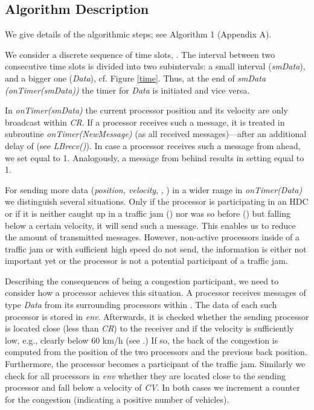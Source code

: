 \documentclass{acmrip}
\begin{document}
\subsection{Algorithm Description}
We give details of the algorithmic steps; see Algorithm 1 (Appendix
A).

We consider a discrete sequence of time slots, . The interval between two consecutive time slots is divided
into two subintervals: a small interval ({\em {smData}}), and a bigger
one ({\em Data}), cf. Figure \ref{time}. Thus, at the end of {\em
smData (onTimer(smData))} the timer for {\em Data} is initiated and
vice versa.


In {\em onTimer(smData)} the current processor position and its
velocity are only broadcast within {\em CR}. If a processor receives such a
message, it is treated in subroutine {\em onTimer(NewMessage)} (as
all received
messages)---after an additional delay of  (see {\em LBrecv()}). In case a processor receives such a message from ahead, we set
 equal to 1. Analogously, a message from behind results in
setting  equal to 1.

For sending more data ({\em position, velocity}, , ) in a
wider range in {\em onTimer(Data)} we distinguish several
situations. Only if the processor is participating in an HDC or if it
is neither caught up in a traffic jam () nor was so before
() but falling below a certain velocity, it will send such
a message. This enables us to reduce the amount of transmitted
messages. However, non-active processors inside of a traffic jam or
with sufficient high speed do not send, the information is either
not important yet or the processor is not a potential participant of
a traffic jam.

Describing the consequences of being a congestion participant, we
need to consider how a processor achieves this situation. A
processor receives messages of type \textit{Data} from its
surrounding processors within . The data of each such processor
is stored in \textit{env}. Afterwards, it is checked whether the
sending processor is located close (less than {\em CR}) to the receiver
and if the velocity is sufficiently low, e.g., clearly below 60 km/h
(see \cite{brilon05,k-mmtfi-97}.) If so, the back of the congestion
is computed from
the position of the two processors and the previous back position.
Furthermore, the processor becomes a participant of the traffic jam.
Similarly we check for all processors in \textit{env} whether they
are located close to the sending processor and fall below a velocity
of {\em CV}. In both cases we increment a counter for the congestion
(indicating a positive number of vehicles).
\end{document}
